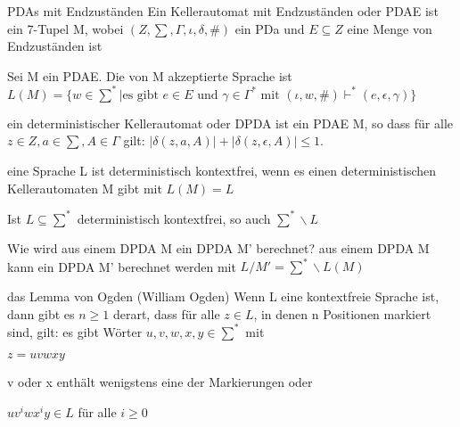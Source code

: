 \documentclass[avery5371, frame]{flashcards}
\begin{document}
\begin{flashcard}[Definition]{PDAs mit Endzuständen}
    Ein Kellerautomat mit Endzuständen oder PDAE ist ein 7-Tupel M, wobei $(Z,\sum,\Gamma, \iota, \delta, \#)$ ein PDa und $E\subseteq Z$ eine Menge von Endzuständen ist
\end{flashcard}

\begin{flashcard}[Definition]{ Sei M ein PDAE. Die von M akzeptierte Sprache ist}
    $L(M)=\{w\in\sum^* | \text{es gibt } e\in E \text{ und } \gamma\in\Gamma^* \text{ mit } (\iota, w,\#)\vdash^* (e,\epsilon,\gamma)\}$
\end{flashcard}

\begin{flashcard}[Definition]{ ein deterministischer Kellerautomat oder DPDA ist ein PDAE M,}
    so dass für alle $z\in Z, a\in\sum, A\in\Gamma$ gilt: $|\delta(z,a,A)|+|\delta(z,\epsilon,A)|\leq 1$.
\end{flashcard}

\begin{flashcard}[Definition]{ eine Sprache L ist deterministisch kontextfrei,}
    wenn es einen deterministischen Kellerautomaten M gibt mit $L(M)=L$
\end{flashcard}

\begin{flashcard}[Satz]{ Ist $L\subseteq \sum^*$ deterministisch kontextfrei, }
    so auch $\sum^*\backslash L$
\end{flashcard}

\begin{flashcard}[Satz]{Wie wird aus einem DPDA M ein DPDA M' berechnet?}
    aus einem DPDA M kann ein DPDA M' berechnet werden mit $L/M'=\sum^*\backslash L(M)$
\end{flashcard}

\begin{flashcard}[Definition]{das Lemma von Ogden (William Ogden)}
    Wenn L eine kontextfreie Sprache ist, dann gibt es $n\geq 1$ derart, dass für alle $z\in L$, in denen n Positionen markiert sind, gilt: es gibt Wörter $u,v,w,x,y\in\sum^*$ mit
    \begin{itemize*}
        \item  $z=uvwxy$
        \item v oder x enthält wenigstens eine der Markierungen oder
        \item $uv^i wx^i y \in L$ für alle $i\geq 0$
    \end{itemize*}
\end{flashcard}
\end{document}
